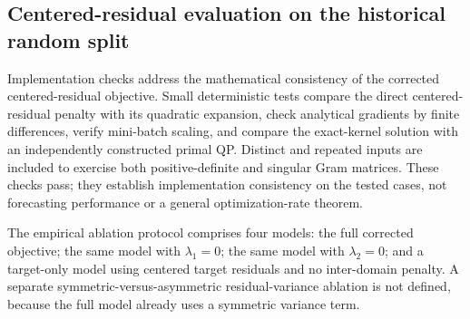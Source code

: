 \subsection{Centered-residual evaluation on the historical random split}\label{sec:exp4}

{\color{blue}Implementation checks address the mathematical consistency of the corrected centered-residual objective. Small deterministic tests compare the direct centered-residual penalty with its quadratic expansion, check analytical gradients by finite differences, verify mini-batch scaling, and compare the exact-kernel solution with an independently constructed primal QP. Distinct and repeated inputs are included to exercise both positive-definite and singular Gram matrices. These checks pass; they establish implementation consistency on the tested cases, not forecasting performance or a general optimization-rate theorem.}

{\color{blue}The empirical ablation protocol comprises four models: the full corrected objective; the same model with $\lambda_1=0$; the same model with $\lambda_2=0$; and a target-only model using centered target residuals and no inter-domain penalty. A separate symmetric-versus-asymmetric residual-variance ablation is not defined, because the full model already uses a symmetric variance term.}


